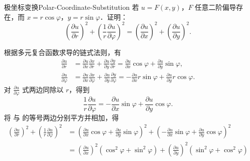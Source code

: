 \begin{problem}{极坐标变换}{Polar-Coordinate-Substitution}
    若 $u = F(x, y)$，$F$ 任意二阶偏导存在，而 $x = r \cos \varphi$，$y = r \sin \varphi$．证明：
    \begin{equation}
        \left(\frac{\partial u}{\partial r}\right)^2 + \left(\frac{1}{r} \frac{\partial u}{\partial \varphi}\right)^2 = \left(\frac{\partial u}{\partial x}\right)^2 + \left(\frac{\partial u}{\partial y}\right)^2.
    \end{equation}
\end{problem}

\begin{myproof}
    根据多元复合函数求导的链式法则，有
    \begin{equation}
        \label{eq:chain-rule-1}
        \begin{aligned}
            \frac{\partial u}{\partial r}       & = \frac{\partial u}{\partial x} \frac{\partial x}{\partial r} + \frac{\partial u}{\partial y} \frac{\partial y}{\partial r} = \frac{\partial u}{\partial x} \cos \varphi + \frac{\partial u}{\partial y} \sin \varphi,                  \\
            \frac{\partial u}{\partial \varphi} & = \frac{\partial u}{\partial x} \frac{\partial x}{\partial \varphi} + \frac{\partial u}{\partial y} \frac{\partial y}{\partial \varphi} = -\frac{\partial u}{\partial x} r \sin \varphi + \frac{\partial u}{\partial y} r \cos \varphi.
        \end{aligned}
    \end{equation}
    对 $\frac{\partial u}{\partial \varphi}$ 式两边同除以 $r$，得到
    \begin{equation}
        \label{eq:chain-rule-2}
        \frac{1}{r} \frac{\partial u}{\partial \varphi} = -\frac{\partial u}{\partial x} \sin \varphi + \frac{\partial u}{\partial y} \cos \varphi.
    \end{equation}
    将  与  的等号两边分别平方并相加，得
    \begin{equation}
        \begin{aligned}
            \left(\frac{\partial u}{\partial r}\right)^2 + \left(\frac{1}{r} \frac{\partial u}{\partial \varphi}\right)^2 & = \left( \frac{\partial u}{\partial x} \cos \varphi + \frac{\partial u}{\partial y} \sin \varphi \right)^2 + \left( -\frac{\partial u}{\partial x} \sin \varphi + \frac{\partial u}{\partial y} \cos \varphi \right)^2 \\
                                                                                                                          & = \left( \frac{\partial u}{\partial x} \right)^2 \left( \cos^2 \varphi + \sin^2 \varphi \right) + \left( \frac{\partial u}{\partial y} \right)^2 \left( \sin^2 \varphi + \cos^2 \varphi \right)                        \\

\end{aligned}
\end{equation}
\end{myproof}
